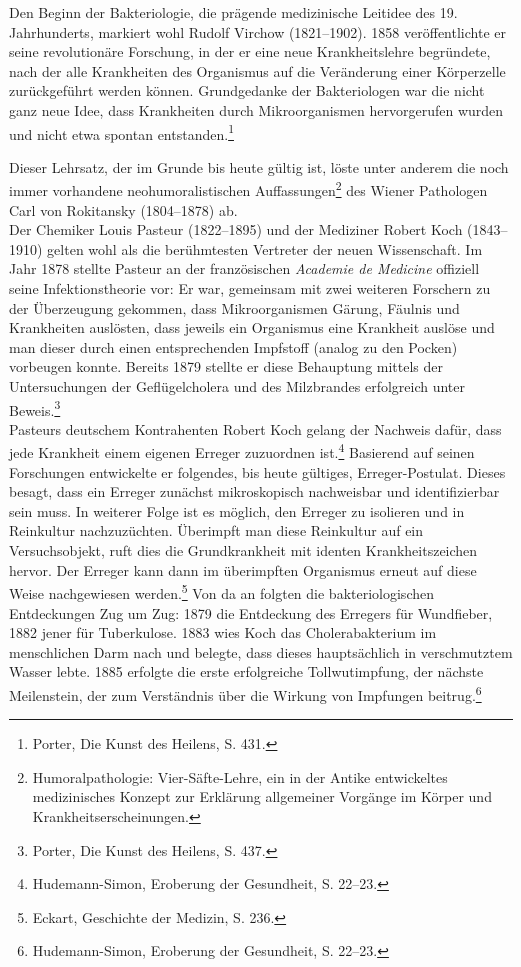 \documentclass[
    a4paper,
    12pt,
    hyphens,
    chapterprefix=true,
    headheight=33pt,
    footheight=29pt,
    headings=optiontohead, %
]{scrartcl}
\begin{document}
Den Beginn der Bakteriologie, die prägende medizinische Leitidee des 19. Jahrhunderts, markiert wohl Rudolf Virchow (1821--1902). 1858 veröffentlichte er seine revolutionäre Forschung, in der er eine neue Krankheitslehre begründete, nach der alle Krankheiten des Organismus auf die Veränderung einer Körperzelle zurückgeführt werden können. Grundgedanke der Bakteriologen war die nicht ganz neue Idee, dass Krankheiten durch Mikroorganismen hervorgerufen wurden und nicht etwa spontan entstanden.\footnote{Porter, Die Kunst des Heilens, S. 431.}

\newpage

Dieser Lehrsatz, der im Grunde bis heute gültig ist, löste unter anderem die noch immer vorhandene neohumoralistischen Auffassungen\footnote{Humoralpathologie: Vier-Säfte-Lehre, ein in der Antike entwickeltes medizinisches Konzept zur Erklärung allgemeiner Vorgänge im
Körper und Krankheitserscheinungen.} des Wiener Pathologen Carl von Rokitansky (1804--1878) ab.\\
Der Chemiker Louis Pasteur (1822--1895) und der Mediziner Robert Koch (1843--1910) gelten wohl als die berühmtesten Vertreter der neuen Wissenschaft. Im Jahr 1878 stellte Pasteur an der französischen \textit{Academie de Medicine} offiziell seine Infektionstheorie vor: Er war, gemeinsam mit zwei weiteren Forschern zu der Überzeugung gekommen, dass Mikroorganismen Gärung, Fäulnis und Krankheiten auslösten, dass jeweils ein Organismus eine Krankheit auslöse und man dieser durch einen entsprechenden Impfstoff (analog zu den Pocken) vorbeugen konnte. Bereits 1879 stellte er diese Behauptung mittels der Untersuchungen der Geflügelcholera und des Milzbrandes erfolgreich unter Beweis.\footnote{Porter, Die Kunst des Heilens, S. 437.}\\
Pasteurs deutschem Kontrahenten Robert Koch gelang der Nachweis dafür, dass jede Krankheit einem eigenen Erreger zuzuordnen ist.\footnote{Hudemann-Simon, Eroberung der Gesundheit, S. 22--23.} Basierend auf seinen Forschungen entwickelte er folgendes, bis heute gültiges, Erreger-Postulat. Dieses besagt, dass ein Erreger zunächst mikroskopisch nachweisbar und identifizierbar sein muss. In weiterer Folge ist es möglich, den Erreger zu isolieren und in Reinkultur nachzuzüchten. Überimpft man diese Reinkultur auf ein Versuchsobjekt, ruft dies die Grundkrankheit mit identen Krankheitszeichen hervor. Der Erreger kann dann im überimpften Organismus erneut auf diese Weise nachgewiesen werden.\footnote{Eckart, Geschichte der Medizin, S. 236.}
Von da an folgten die bakteriologischen Entdeckungen Zug um Zug: 1879 die Entdeckung des Erregers für Wundfieber, 1882 jener für Tuberkulose. 1883 wies Koch das Cholerabakterium im menschlichen Darm nach und belegte, dass dieses hauptsächlich in verschmutztem Wasser lebte. 1885 erfolgte die erste erfolgreiche Tollwutimpfung, der nächste Meilenstein, der zum Verständnis über die Wirkung von Impfungen beitrug.\footnote{Hudemann-Simon, Eroberung der Gesundheit, S. 22--23.}
\end{document}
